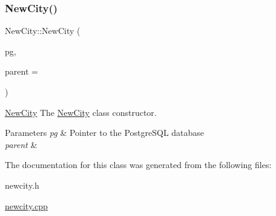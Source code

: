 \subsubsection{\texorpdfstring{New\+City()}{NewCity()}}
{\footnotesize\ttfamily New\+City\+::\+New\+City (\begin{DoxyParamCaption}\item[{\hyperlink{classpsql}{psql} $\ast$}]{pg,  }\item[{Q\+Widget $\ast$}]{parent = {} }\end{DoxyParamCaption})\hspace{0.3cm}{\ttfamily [explicit]}}



\hyperlink{class_new_city}{New\+City} The \hyperlink{class_new_city}{New\+City} class constructor. 


\begin{DoxyParams}{Parameters}
{\em pg} & Pointer to the Postgre\+S\+QL database \\
\hline
{\em parent} & \\
\hline
\end{DoxyParams}


The documentation for this class was generated from the following files\+:\begin{DoxyCompactItemize}
\item 
newcity.\+h\item 
\hyperlink{newcity_8cpp}{newcity.\+cpp}\end{DoxyCompactItemize}
